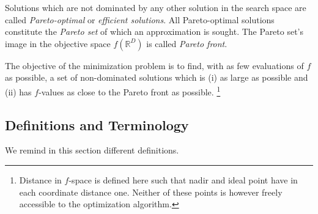 \documentclass[letterpaper,12pt,english]{article}
\begin{document}
Solutions which are not dominated by any other solution in the search
space are called \emph{Pareto-optimal} or \emph{efficient solutions}. All
Pareto-optimal solutions constitute the \emph{Pareto set} of which an
approximation is sought. The Pareto set's image in the
objective space \(f(\mathbb{R}^D)\) is called \emph{Pareto front}.

The objective of the minimization problem is to find, with as few evaluations
of \(f\) as possible, a set of non-dominated solutions which is (i) as large
as possible and (ii) has \(f\)-values as close to the Pareto front as possible. \footnote[1]{
Distance in \(f\)-space is defined here such that nadir and ideal point
have in each coordinate distance one. Neither of these points is however
freely accessible to the optimization algorithm.
}


\subsection{Definitions and Terminology}
\label{index:definitions-and-terminology}
We remind in this section different definitions.
\end{document}
